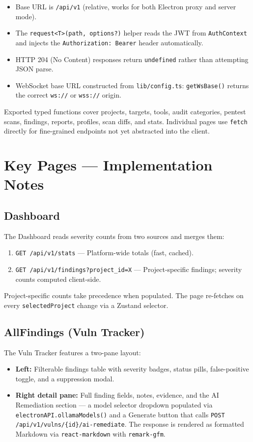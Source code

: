 \documentclass[11pt,a4paper,twoside,openright]{book}
\begin{document}
\begin{itemize}[leftmargin=*,noitemsep]
  \item Base URL is \texttt{/api/v1} (relative, works for both Electron proxy and server mode).
  \item The \texttt{request<T>(path, options?)} helper reads the JWT from \texttt{AuthContext} and injects the \texttt{Authorization: Bearer} header automatically.
  \item HTTP 204 (No Content) responses return \texttt{undefined} rather than attempting JSON parse.
  \item WebSocket base URL constructed from \texttt{lib/config.ts}: \texttt{getWsBase()} returns the correct \texttt{ws://} or \texttt{wss://} origin.
\end{itemize}

Exported typed functions cover projects, targets, tools, audit categories, pentest scans, findings, reports, profiles, scan diffs, and stats. Individual pages use \texttt{fetch} directly for fine-grained endpoints not yet abstracted into the client.

\section{Key Pages — Implementation Notes}

\subsection{Dashboard}

The Dashboard reads severity counts from two sources and merges them:

\begin{enumerate}[leftmargin=*,noitemsep]
  \item \texttt{GET /api/v1/stats} — Platform-wide totals (fast, cached).
  \item \texttt{GET /api/v1/findings?project\_id=X} — Project-specific findings; severity counts computed client-side.
\end{enumerate}

Project-specific counts take precedence when populated. The page re-fetches on every \texttt{selectedProject} change via a Zustand selector.

\subsection{AllFindings (Vuln Tracker)}

The Vuln Tracker features a two-pane layout:
\begin{itemize}[leftmargin=*,noitemsep]
  \item \textbf{Left:} Filterable findings table with severity badges, status pills, false-positive toggle, and a suppression modal.
  \item \textbf{Right detail pane:} Full finding fields, notes, evidence, and the AI Remediation section — a model selector dropdown populated via \texttt{electronAPI.ollamaModels()} and a Generate button that calls \texttt{POST /api/v1/vulns/\{id\}/ai-remediate}. The response is rendered as formatted Markdown via \texttt{react-markdown} with \texttt{remark-gfm}.
\end{itemize}
\end{document}
